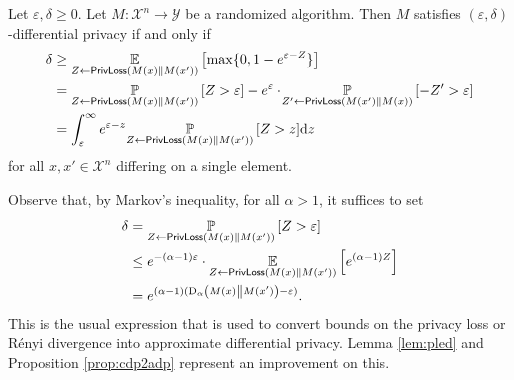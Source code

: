 \documentclass{jpcfinal} %
\newcommand{\ex}[2]{{\ifx&#1& \mathbb{E} \else
\underset{#1}{\mathbb{E}} \fi \left[#2\right]}}
\newcommand{\pr}[2]{{\ifx&#1& \mathbb{P} \else
\underset{#1}{\mathbb{P}} \fi \left[#2\right]}}
\newcommand{\dr}[3]{\mathrm{D}_{#1}\left(#2\middle\|#3\right)}
\newcommand{\eps}{\varepsilon}
\newcommand{\privloss}[2]{\mathsf{PrivLoss}\left(#1\middle\|#2\right)}
\newcommand{\dx}[1][x]{\mathrm{d}#1}
\begin{document}
\begin{lem}\label{lem:pled}Let $\eps,\delta\ge 0$. Let $M\colon \mathcal{X}^n \to \mathcal{Y}$ be a randomized algorithm. Then $M$ satisfies $(\eps,\delta)$-differential privacy if and only if
\begin{align}
    \delta 
    &\ge \ex{Z \gets \privloss{M(x)}{M(x')}}{\max\{0,1-e^{\eps-Z}\}} \label{eq:pled1}\\
    &= \pr{Z \gets \privloss{M(x)}{M(x')}}{Z>\eps} - e^\eps \cdot \! \pr{Z' \gets \privloss{M(x')}{M(x)}}{-Z'>\eps}\label{eq:pled2}\\
    &= \int_\eps^\infty e^{\eps-z} \pr{Z \gets \privloss{M(x)}{M(x')}}{Z>z} \dx[z] \label{eq:pled3}
\end{align}
for all $x,x' \in \mathcal{X}^n$ differing on a single element.
\end{lem}
\noindent Observe that, by Markov's inequality, for all $\alpha > 1$, it suffices to set
\begin{align}
    \delta &= \pr{Z \gets \privloss{M(x)}{M(x')}}{Z>\eps} \notag\\
    &\le e^{-(\alpha-1)\eps} \cdot \ex{Z \gets \privloss{M(x)}{M(x')}}{e^{(\alpha-1)Z}} \notag\\
    &= e^{(\alpha-1)(\dr{\alpha}{M(x)}{M(x')} - \eps)}.
\end{align} This is the usual expression that is used to convert bounds on the privacy loss or R\'enyi divergence into approximate differential privacy. Lemma \ref{lem:pled} and Proposition \ref{prop:cdp2adp} represent an improvement on this.
\end{document}
